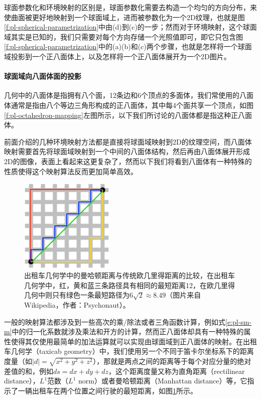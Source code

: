 球面参数化和环境映射的区别是，球面参数化需要去构造一个均匀的方向分布，来使曲面被更好地映射到一个球面域上，进而被参数化为一个2D纹理，也就是图\ref{f:pl-spherical-parametrization}中由(d)到(c)的一步；然而对于环境映射，这个球面域其实是已知的，我们只需要对每个方向存储一个光照值即可，即它只包含图\ref{f:pl-spherical-parametrization}中的(a)(b)和(c)两个步骤，也就是怎样将一个球面域投影到一个正八面体上，以及怎样将一个正八面体展开为一个2D图片。



\paragraph{球面域向八面体面的投影}
几何中的八面体是指拥有八个面，12条边和6个顶点的多面体，我们常使用的八面体通常是指由八个等边三角形构成的正八面体，其中每4个面共享一个顶点，如图\ref{f:pl-octahedron-mapping}左图所示，以下我们所讨论的八面体都是指这种正八面体。

前面介绍的几种环境映射方法都是直接将球面域映射到2D的纹理空间，而八面体映射需要首先将球面域映射到一个中间的八面体结构，然后再由八面体展开形成2D的图像，表面上看起来这更复杂了，然而以下我们将看到八面体有一种特殊的性质使得这个映射算法反而更加简单高效。

\begin{figure}
	\sidecaption
	\includegraphics[width=0.4\textwidth]{figures/pl/manhattan-distance}
	\caption{出租车几何学中的曼哈顿距离与传统欧几里得距离的比较，在出租车几何学中，红，黄和蓝三条路径具有相同的最短距离12，在欧几里得几何中则只有绿色一条最短路径为$6\sqrt{2}\approx 8.49$（图片来自Wikipedia，作者：Psychonaut）。}
	\label{f:pl-manhattan-distance}
\end{figure}

一般的映射算法都涉及到一些高次的乘/除法或者三角函数计算，例如式\ref{e:pl-sm-m}中的归一化系数就涉及乘法和开方的计算，然而正八面体却具有一种特殊的属性使得其仅使用最简单的加法运算就可以实现由球面域到正八面体的映射。在出租车几何学（taxicab geometry）中，我们使用另一个不同于笛卡尔坐标系下的距离度量（如$|d|=\sqrt{x^{2}+y^{2}+z^{2}}$），那就是两点之间的距离等于每个对应分量的绝对差值的和，例如$ds=dx+dy+dz$，这个距离度量又称为直角距离（rectilinear distance），$L^{1}$范数（$L^{1}$ norm）或者曼哈顿距离（Manhattan distance）等，它指示了一辆出租车在两个位置之间行驶的最短距离，如图\ref{f:pl-manhattan-distance}所示。


